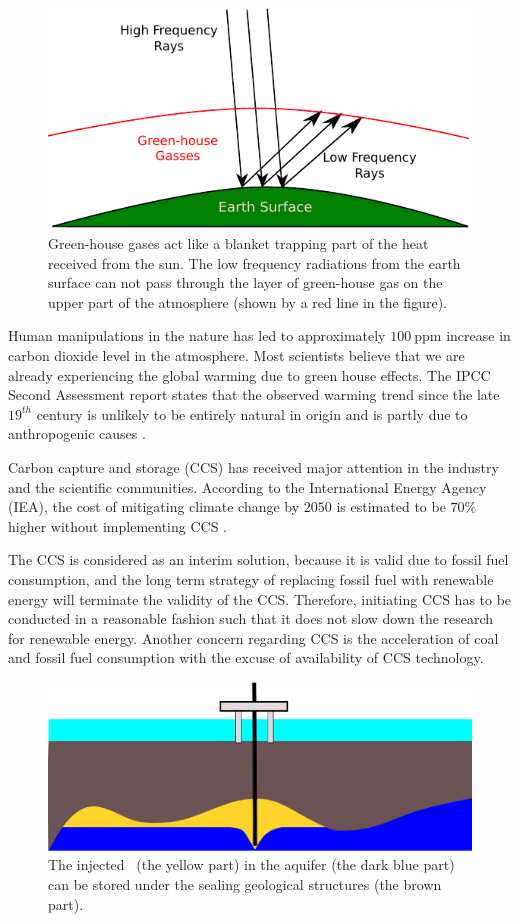\begin{figure}
  \centering
  \includegraphics[width=0.65 \linewidth]{./figurer/G-H_gasses} 
  \caption{Green-house gases act like a blanket trapping part of the heat received from
the sun. The low frequency radiations from the earth surface can not pass through the layer of green-house gas on the upper part of the atmosphere (shown by a red line in the figure).}
  \label{fig:grHsGs}
%
\end{figure}

Human manipulations in the nature has led to approximately $100~\mbox{ppm}$ increase in carbon dioxide level in the atmosphere. Most scientists believe that we are already experiencing the global warming due to green house effects. The IPCC Second Assessment report states that the observed warming trend since the late $19^{th}$ century is unlikely to be entirely natural in origin and is partly due to anthropogenic causes \cite{change1995ipcc}. 

Carbon capture and storage (CCS) has received major attention in the industry and the scientific communities. According to the International Energy Agency (IEA), the cost of mitigating climate change by $2050$ is estimated to be $70\%$ higher without implementing CCS \cite{iaeScenario}.

The CCS is considered as an interim solution, because it is valid due to fossil fuel consumption, and the long term strategy of replacing fossil fuel with renewable energy will terminate the validity of the CCS. Therefore, initiating CCS has to be conducted in a reasonable fashion such that it does not slow down the research for renewable energy. Another concern regarding CCS is the acceleration of coal and fossil fuel consumption with the excuse of availability of CCS technology.

\begin{figure}
  \centering
  \includegraphics[width=0.65 \linewidth]{./figurer/platform} 
  \caption{The injected \coo\ (the yellow part) in the aquifer (the dark blue part) can be stored under the sealing geological structures (the brown part).}
  \label{fig:platform}
%
\end{figure}


